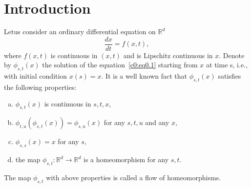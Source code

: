 \setcounter{chapter}{-1}

\chapter{Introduction}\label{chap0}

Let\pageoriginale us consider an ordinary differential equation on $\mathbb{R}^d$
\begin{equation*}
  \frac{dx}{dt} = f (x,t), \tag{0.1}\label{c0:eq0.1}
\end{equation*}
where $f(x,t)$ is continuous in $(x,t)$ and is Lipschitz continuous in
$x$. Denote by $\phi_{s,t}(x)$ the solution of the equation~\eqref{c0:eq0.1}
starting from $x$ at time s, i.e., with initial condition $x(s) =
x$. It is a well known fact that $\phi_{s,t}(x)$ satisfies the
following properties: 

\begin{enumerate}[(a)]
\item $\phi_{s,t}(x)$ is continuous in $s,t,x$,
\item $\phi_{t,u} (\phi_{s,t}(x)) = \phi_{s,u}(x)$ for any $s,t,u$ and any $x$,
\item $\phi_{s,s}(x) = x$ for any $s$,
\item the map $\phi_{s,t}: \mathbb{R}^d \rightarrow \mathbb{R}^d$ is a
  homeomorphism for any $s,t$. 
\end{enumerate}

The map $\phi_{s,t}$ with above properties is called a flow of homeomorphisms.

